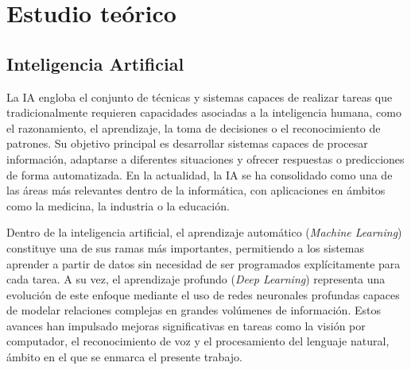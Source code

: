 %
%
%
% 
%
%
%
%

\chapter{Estudio teórico}
\label{cha:estudio-teorico}


\section{Inteligencia Artificial}

La \ac{IA} engloba el conjunto de técnicas y sistemas capaces de realizar tareas que tradicionalmente requieren capacidades asociadas a la inteligencia humana, como el razonamiento, el aprendizaje, la toma de decisiones o el reconocimiento de patrones. Su objetivo principal es desarrollar sistemas capaces de procesar información, adaptarse a diferentes situaciones y ofrecer respuestas o predicciones de forma automatizada. En la actualidad, la \ac{IA} se ha consolidado como una de las áreas más relevantes dentro de la informática, con aplicaciones en ámbitos como la medicina, la industria o la educación.

Dentro de la inteligencia artificial, el aprendizaje automático (\textit{Machine Learning}) constituye una de sus ramas más importantes, permitiendo a los sistemas aprender a partir de datos sin necesidad de ser programados explícitamente para cada tarea. A su vez, el aprendizaje profundo (\textit{Deep Learning}) representa una evolución de este enfoque mediante el uso de redes neuronales profundas capaces de modelar relaciones complejas en grandes volúmenes de información. Estos avances han impulsado mejoras significativas en tareas como la visión por computador, el reconocimiento de voz y el procesamiento del lenguaje natural, ámbito en el que se enmarca el presente trabajo.


